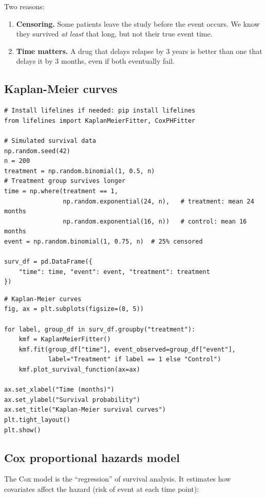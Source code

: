 Two reasons:
\begin{enumerate}
  \item \textbf{Censoring.} Some patients leave the study before the event occurs. We know they survived \emph{at least} that long, but not their true event time.
  \item \textbf{Time matters.} A drug that delays relapse by 3 years is better than one that delays it by 3 months, even if both eventually fail.
\end{enumerate}

\subsection{Kaplan-Meier curves}

\begin{verbatim}
# Install lifelines if needed: pip install lifelines
from lifelines import KaplanMeierFitter, CoxPHFitter

# Simulated survival data
np.random.seed(42)
n = 200
treatment = np.random.binomial(1, 0.5, n)
# Treatment group survives longer
time = np.where(treatment == 1,
                np.random.exponential(24, n),   # treatment: mean 24 months
                np.random.exponential(16, n))   # control: mean 16 months
event = np.random.binomial(1, 0.75, n)  # 25% censored

surv_df = pd.DataFrame({
    "time": time, "event": event, "treatment": treatment
})
\end{verbatim}

\begin{verbatim}
# Kaplan-Meier curves
fig, ax = plt.subplots(figsize=(8, 5))

for label, group_df in surv_df.groupby("treatment"):
    kmf = KaplanMeierFitter()
    kmf.fit(group_df["time"], event_observed=group_df["event"],
            label="Treatment" if label == 1 else "Control")
    kmf.plot_survival_function(ax=ax)

ax.set_xlabel("Time (months)")
ax.set_ylabel("Survival probability")
ax.set_title("Kaplan-Meier survival curves")
plt.tight_layout()
plt.show()
\end{verbatim}

\subsection{Cox proportional hazards model}

The Cox model is the ``regression'' of survival analysis. It estimates how covariates affect the hazard (risk of event at each time point):

